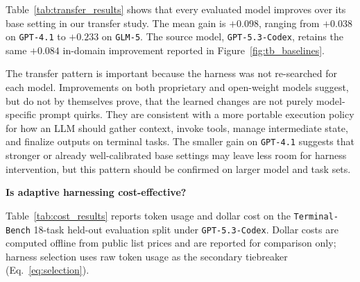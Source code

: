 \documentclass{article}
\begin{document}
Table~\ref{tab:transfer_results} shows that every evaluated model
improves over its base setting in our transfer study. The mean gain is
$+0.098$, ranging from $+0.038$ on \texttt{GPT-4.1} to $+0.233$ on
\texttt{GLM-5}. The source model, \texttt{GPT-5.3-Codex}, retains the
same $+0.084$ in-domain improvement reported in
Figure~\ref{fig:tb_baselines}.

The transfer pattern is important because the harness was not
re-searched for each model. Improvements on both proprietary and
open-weight models suggest, but do not by themselves prove, that the
learned changes are not purely model-specific prompt quirks. They are
consistent with a more portable execution policy for how an LLM should
gather context, invoke tools, manage intermediate state, and finalize
outputs on terminal tasks. The smaller gain on \texttt{GPT-4.1}
suggests that stronger or already well-calibrated base settings may
leave less room for harness intervention, but this pattern should be
confirmed on larger model and task sets.

\noindent{}\hspace{0.45em}\textbf{Is adaptive harnessing cost-effective?}

Table~\ref{tab:cost_results} reports token usage and dollar cost on the
\texttt{Terminal-Bench} 18-task held-out evaluation split under
\texttt{GPT-5.3-Codex}.
Dollar costs are computed offline from public list prices and are
reported for comparison only; harness selection uses raw token usage as
the secondary tiebreaker (Eq.~\ref{eq:selection}).
\end{document}
